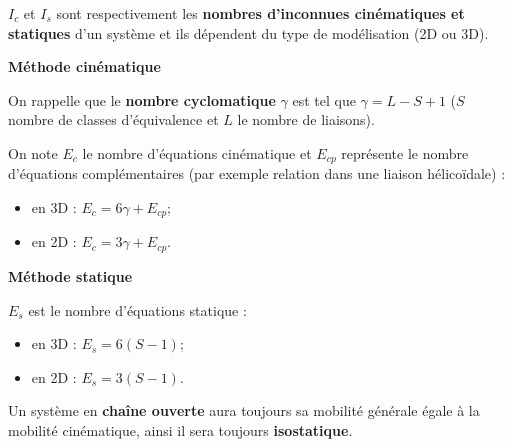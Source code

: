 \documentclass[10pt,fleqn]{article} %
\begin{document}
\begin{definition}[Notations]

$I_c$ et $I_s$ sont respectivement les \textbf{nombres d'inconnues cinématiques et statiques} d'un système et ils dépendent du type de modélisation (2D ou 3D).




\vspace{-.6cm}

\begin{multicols}{2}
\begin{center}
\textbf{Méthode cinématique}
\end{center}


On rappelle que le \textbf{nombre cyclomatique}  $\gamma$
est tel que $\gamma=L-S+1$ ($S$ nombre de classes d'équivalence et $L$ le nombre de liaisons).

On note $E_c$ le nombre d'équations cinématique et $E_{cp}$ représente le nombre d'équations complémentaires (par exemple relation dans une liaison hélicoïdale) :
\begin{itemize}
 \item en 3D : $E_c=6\gamma+E_{cp}$;
 \item en 2D : $E_c=3\gamma+E_{cp}$.
\end{itemize}

\vfill\null
\columnbreak

\begin{center}
\textbf{Méthode statique} 
\end{center}


$E_s$ est le nombre d'équations statique :
				\begin{itemize}
					\item en 3D : $E_s=6 (S-1)$;
					\item en 2D : $E_s=3 (S-1)$.
				\end{itemize}


\end{multicols}



		
\end{definition}

\begin{rem}
Un système en \textbf{chaîne ouverte} aura toujours sa mobilité générale égale à la mobilité cinématique, ainsi il sera toujours \textbf{isostatique}.
\end{rem}
\end{document}
